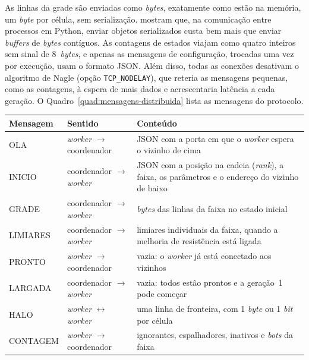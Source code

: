 As linhas da grade são enviadas como \textit{bytes}, exatamente como estão na memória, um \textit{byte} por célula, sem serialização.  mostram que, na comunicação entre processos em Python, enviar objetos serializados custa bem mais que enviar \textit{buffers} de \textit{bytes} contíguos. As contagens de estados viajam como quatro inteiros sem sinal de 8~\textit{bytes}, e apenas as mensagens de configuração, trocadas uma vez por execução, usam o formato JSON. Além disso, todas as conexões desativam o algoritmo de Nagle (opção \texttt{TCP\_NODELAY}), que reteria as mensagens pequenas, como as contagens, à espera de mais dados e acrescentaria latência a cada geração. O Quadro~\ref{quad:mensagens-distribuida} lista as mensagens do protocolo.

\begin{tabframed}[!htb]
    \caption{Mensagens do protocolo da versão distribuída}
    \label{quad:mensagens-distribuida}
    \centering
    \footnotesize
    \begin{tabular}{|l|l|p{8.6cm}|}
        \hline
        \textbf{Mensagem} & \textbf{Sentido} & \textbf{Conteúdo} \\
        \hline
        OLA & \textit{worker} $\rightarrow$ coordenador & JSON com a porta em que o \textit{worker} espera o vizinho de cima \\
        INICIO & coordenador $\rightarrow$ \textit{worker} & JSON com a posição na cadeia (\textit{rank}), a faixa, os parâmetros e o endereço do vizinho de baixo \\
        GRADE & coordenador $\rightarrow$ \textit{worker} & \textit{bytes} das linhas da faixa no estado inicial \\
        LIMIARES & coordenador $\rightarrow$ \textit{worker} & limiares individuais da faixa, quando a melhoria de resistência está ligada \\
        PRONTO & \textit{worker} $\rightarrow$ coordenador & vazia: o \textit{worker} já está conectado aos vizinhos \\
        LARGADA & coordenador $\rightarrow$ \textit{worker} & vazia: todos estão prontos e a geração~1 pode começar \\
        HALO & \textit{worker} $\leftrightarrow$ \textit{worker} & uma linha de fronteira, com 1 \textit{byte} ou 1 \textit{bit} por célula \\
        CONTAGEM & \textit{worker} $\rightarrow$ coordenador & ignorantes, espalhadores, inativos e \textit{bots} da faixa \\

\end{tabular}
\end{tabframed}
